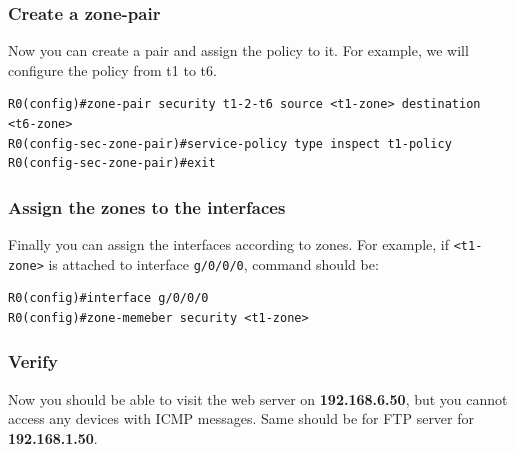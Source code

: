 \documentclass[11pt,a4paper]{article}
\begin{document}
\subsubsection{Create a zone-pair}\label{create-a-zone-pair}

Now you can create a pair and assign the policy to it. For example, we
will configure the policy from t1 to t6.

\begin{verbatim}
R0(config)#zone-pair security t1-2-t6 source <t1-zone> destination <t6-zone>
R0(config-sec-zone-pair)#service-policy type inspect t1-policy
R0(config-sec-zone-pair)#exit
\end{verbatim}

\subsubsection{Assign the zones to the
interfaces}\label{assign-the-zones-to-the-interfaces}

Finally you can assign the interfaces according to zones. For example,
if \texttt{\textless{}t1-zone\textgreater{}} is attached to interface
\texttt{g/0/0/0}, command should be:

\begin{verbatim}
R0(config)#interface g/0/0/0
R0(config)#zone-memeber security <t1-zone>
\end{verbatim}

\subsubsection{Verify}\label{verify}

Now you should be able to visit the web server on \textbf{192.168.6.50},
but you cannot access any devices with ICMP messages. Same should be for
FTP server for \textbf{192.168.1.50}.
\end{document}
